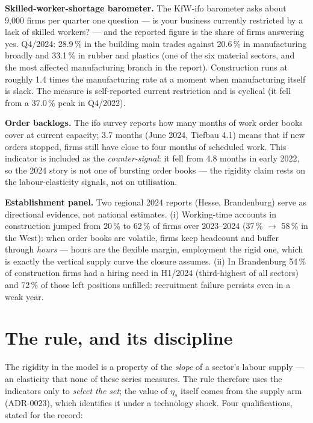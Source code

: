 \documentclass[11pt]{article}
\begin{document}
\textbf{Skilled-worker-shortage barometer.} The KfW-ifo barometer asks about
9{,}000 firms per quarter one question --- is your business currently
restricted by a lack of skilled workers? --- and the reported figure is the
share of firms answering yes. Q4/2024: 28.9\,\% in the building main trades
against 20.6\,\% in manufacturing broadly and 33.1\,\% in rubber and
plastics (one of the six material sectors, and the most affected
manufacturing branch in the report). Construction runs at roughly 1.4 times
the manufacturing rate at a moment when manufacturing itself is slack. The
measure is self-reported current restriction and is cyclical (it fell from a
37.0\,\% peak in Q4/2022).

\textbf{Order backlogs.} The ifo survey reports how many months of work
order books cover at current capacity; 3.7 months (June 2024, Tiefbau 4.1)
means that if new orders stopped, firms still have close to four months of
scheduled work. This indicator is included as the \emph{counter-signal}: it
fell from 4.8 months in early 2022, so the 2024 story is not one of bursting
order books --- the rigidity claim rests on the labour-elasticity signals,
not on utilisation.

\textbf{Establishment panel.} Two regional 2024 reports (Hesse, Brandenburg)
serve as directional evidence, not national estimates. (i) Working-time
accounts in construction jumped from 20\,\% to 62\,\% of firms over
2023--2024 (37\,\% $\to$ 58\,\% in the West): when order books are volatile,
firms keep headcount and buffer through \emph{hours} --- hours are the
flexible margin, employment the rigid one, which is exactly the vertical
supply curve the closure assumes. (ii) In Brandenburg 54\,\% of construction
firms had a hiring need in H1/2024 (third-highest of all sectors) and 72\,\%
of those left positions unfilled: recruitment failure persists even in a
weak year.

\section{The rule, and its discipline}\label{sec:discipline}

The rigidity in the model is a property of the \emph{slope} of a sector's
labour supply --- an elasticity that none of these series measures. The
rule therefore uses the indicators only to \emph{select the set}; the value
of $\eta_s$ itself comes from the supply arm (ADR-0023), which identifies it
under a technology shock. Four qualifications, stated for the record:
\end{document}
